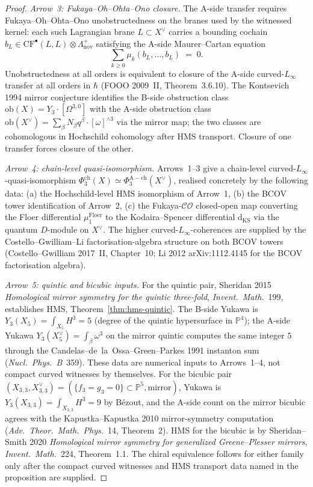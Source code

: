 \begin{proof}
\textit{Arrow~3: Fukaya--Oh--Ohta--Ono closure.} The A-side transfer requires Fukaya--Oh--Ohta--Ono unobstructedness on the branes used by the witnessed kernel: each such Lagrangian brane $L \subset X^\vee$ carries a bounding cochain $b_L \in \mathrm{CF}^\bullet(L, L) \otimes \Lambda^+_{\mathrm{nov}}$ satisfying the A-side Maurer--Cartan equation
\[
 \sum_{k \geq 0} \mu_k(b_L, \ldots, b_L) \;=\; 0.
\]
Unobstructedness at all orders is equivalent to closure of the A-side curved-$L_\infty$ transfer at all orders in $\hbar$ (FOOO 2009~II, Theorem~3.6.10). The Kontsevich 1994 mirror conjecture identifies the B-side obstruction class $\mathrm{ob}(X) = Y_3 \cdot [\Omega^{3,0}]$ with the A-side obstruction class $\mathrm{ob}(X^\vee) = \sum_\beta N_\beta q^\beta \cdot [\omega]^{\wedge 3}$ via the mirror map; the two classes are cohomologous in Hochschild cohomology after HMS transport. Closure of one transfer forces closure of the other.

\textit{Arrow~4: chain-level quasi-isomorphism.} Arrows~1--3 give a chain-level curved-$L_\infty$-quasi-isomorphism $\Phi_3^{\mathrm{ch}}(X) \simeq \Phi_3^{\mathrm{A-ch}}(X^\vee)$, realised concretely by the following data: (a) the Hochschild-level HMS isomorphism of Arrow~1, (b) the BCOV tower identification of Arrow~2, (c) the Fukaya-$\mathcal{CO}$ closed-open map converting the Floer differential $\mu_1^{\mathrm{Floer}}$ to the Kodaira--Spencer differential $\mathrm{d}_{\mathrm{KS}}$ via the quantum $D$-module on $X^\vee$. The higher curved-$L_\infty$-coherences are supplied by the Costello--Gwilliam--Li factorisation-algebra structure on both BCOV towers (Costello--Gwilliam 2017~II, Chapter~10; Li 2012 arXiv:1112.4145 for the BCOV factorisation algebra).

\textit{Arrow~5: quintic and bicubic inputs.} For the quintic pair, Sheridan 2015 \textit{Homological mirror symmetry for the quintic three-fold}, \textit{Invent.~Math.}~199, establishes HMS, Theorem~\ref{thm:hms-quintic}. The B-side Yukawa is $Y_3(X_5) = \int_{X_5} H^3 = 5$ (degree of the quintic hypersurface in $\mathbb{P}^4$); the A-side Yukawa $Y_3(X_5^\vee) = \int_{\beta} \omega^3$ on the mirror quintic computes the same integer $5$ through the Candelas--de~la~Ossa--Green--Parkes 1991 instanton sum (\textit{Nucl.~Phys.~B}~359). These data are numerical inputs to Arrows~1--4, not compact curved witnesses by themselves. For the bicubic pair $(X_{3,3}, X_{3,3}^\vee) = (\{f_3 = g_3 = 0\} \subset \mathbb{P}^5, \text{mirror})$, Yukawa is $Y_3(X_{3,3}) = \int_{X_{3,3}} H^3 = 9$ by B\'ezout, and the A-side count on the mirror bicubic agrees with the Kapustka--Kapustka 2010 mirror-symmetry computation (\textit{Adv.~Theor.~Math.~Phys.}~14, Theorem~2). HMS for the bicubic is by Sheridan--Smith 2020 \textit{Homological mirror symmetry for generalized Greene--Plesser mirrors}, \textit{Invent.~Math.}~224, Theorem~1.1. The chiral equivalence follows for either family only after the compact curved witnesses and HMS transport data named in the proposition are supplied.


\end{proof}

